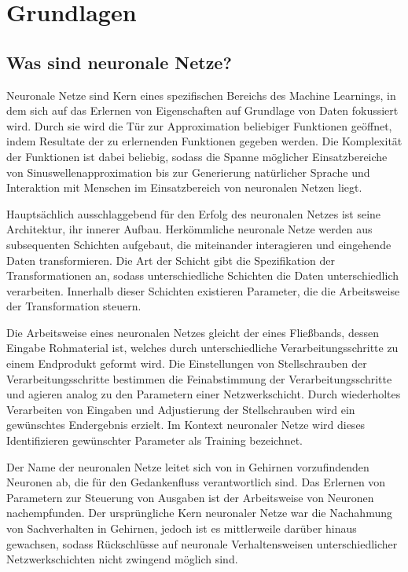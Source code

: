 
\section{Grundlagen}
\label{sec:ki:grundlagen}



\subsection{Was sind neuronale Netze?}
\label{sec:was_nn}

Neuronale Netze sind Kern eines spezifischen Bereichs des Machine Learnings, in dem sich auf das Erlernen von Eigenschaften auf Grundlage von Daten fokussiert wird. Durch sie wird die Tür zur Approximation beliebiger Funktionen geöffnet, indem Resultate der zu erlernenden Funktionen gegeben werden. Die Komplexität der Funktionen ist dabei beliebig, sodass die Spanne möglicher Einsatzbereiche von Sinuswellenapproximation bis zur Generierung natürlicher Sprache und Interaktion mit Menschen im Einsatzbereich von neuronalen Netzen liegt.

Hauptsächlich ausschlaggebend für den Erfolg des neuronalen Netzes ist seine Architektur, ihr innerer Aufbau. Herkömmliche neuronale Netze werden aus subsequenten Schichten aufgebaut, die miteinander interagieren und eingehende Daten transformieren. Die Art der Schicht gibt die Spezifikation der Transformationen an, sodass unterschiedliche Schichten die Daten unterschiedlich verarbeiten. Innerhalb dieser Schichten existieren Parameter, die die Arbeitsweise der Transformation steuern.

Die Arbeitsweise eines neuronalen Netzes gleicht der eines Fließbands, dessen Eingabe Rohmaterial ist, welches durch unterschiedliche Verarbeitungsschritte zu einem Endprodukt geformt wird. Die Einstellungen von Stellschrauben der Verarbeitungsschritte bestimmen die Feinabstimmung der Verarbeitungsschritte und agieren analog zu den Parametern einer Netzwerkschicht. Durch wiederholtes Verarbeiten von Eingaben und Adjustierung der Stellschrauben wird ein gewünschtes Endergebnis erzielt. Im Kontext neuronaler Netze wird dieses Identifizieren gewünschter Parameter als Training bezeichnet.

Der Name der neuronalen Netze leitet sich von in Gehirnen vorzufindenden Neuronen ab, die für den Gedankenfluss verantwortlich sind. Das Erlernen von Parametern zur Steuerung von Ausgaben ist der Arbeitsweise von Neuronen nachempfunden. Der ursprüngliche Kern neuronaler Netze war die Nachahmung von Sachverhalten in Gehirnen, jedoch ist es mittlerweile darüber hinaus gewachsen, sodass Rückschlüsse auf neuronale Verhaltensweisen unterschiedlicher Netzwerkschichten nicht zwingend möglich sind.

